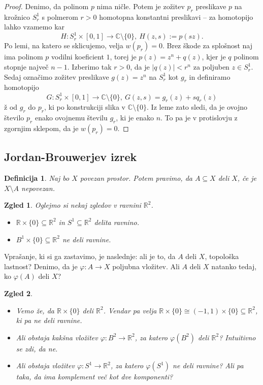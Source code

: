 \documentclass[10pt, a4paper]{article}
\newtheorem{defi}{Definicija}[section]
\newenvironment{noticeB}{%
  \tcolorbox[%
  notitle,
  empty,
  enhanced,  %
  breakable,
  coltext=black,
  colback=white, 
  fontupper=\rmfamily,
  parbox=false,
  noparskip,
  sharp corners,
  boxrule=-1pt,  %
  frame hidden,
  left=7pt,  %
  right=7pt,
  top=5pt,
  bottom=5pt,
  before skip=2.5ex plus 2pt,
  after skip=2.5ex plus 2pt,
  borderline west = {1.5pt}{-0.1pt}{blue!30!black}, %
  overlay unbroken and last={%
    \draw[color=black, line width=1.25pt]
    ($(frame.south west)+(1.pt, -0.1pt)$) -- ++(2em, 0);
  }
  ]}
{\endtcolorbox}
\newenvironment{definicija}{\begin{defi}\begin{noticeB}}{%
    \end{noticeB}\end{defi}}
\newtheorem{zgled}{Zgled}[section]
\newenvironment{noticeC}{%
  \tcolorbox[%
  notitle,
  empty,
  enhanced,  %
  breakable,
  coltext=black, 
  fontupper=\rmfamily,
  parbox=false,
  noparskip,
  sharp corners,
  boxrule=-1pt,  %
  frame hidden,
  left=7pt,  %
  right=7pt,
  top=5pt,
  bottom=5pt,
  before skip=2.5ex plus 2pt,
  after skip=2.5ex plus 2pt,
  overlay unbroken and last={%
  },
  ]}
{\endtcolorbox}
\newenvironment{dokaz}%
  {\begin{noticeC}\begin{proof}}%
  {\end{proof}\end{noticeC}}
\newcommand{\R}{\mathbb {R}}
\newcommand{\C}{\mathbb {C}}
\begin{document}
\begin{dokaz}
  Denimo, da polinom $p$ nima ničle. Potem je zožitev $p_r$ preslikave $p$ 
  na krožnico $S_r^1$ s polmerom $r > 0$ homotopna konstantni preslikavi -- za homotopijo 
  lahko vzamemo kar $$H: S_r ^1 \times [0, 1] \to \C \setminus \{0\},\ H(z, s) := p(sz).$$
  Po lemi, na katero se sklicujemo, velja $w(p_r) = 0.$
  Brez škode za splošnost naj ima polinom $p$ vodilni koeficient $1$, torej je 
  $p(z) = z^n + q(z)$, kjer je $q$ polinom stopnje največ $n - 1$.
  Izberimo tak $r > 0$, da je $|q(z)| < r^n$ za poljuben $z \in S^1 _r$.
  Sedaj označimo zožitev preslikave $g(z) = z^n$ na $S^1 _r$ kot $g_r$ in definiramo homotopijo 
  $$G: S_r ^1 \times [0, 1] \to \C \setminus \{0\},\ G(z, s) = g_r (z) + s q_r(z)$$ ž
  od $g_r$ do $p_r$, ki po konstrukciji slika v $\C \setminus \{0\}$.
  Iz leme zato sledi, da je ovojno število $p_r$ enako ovojnemu številu $g_r$, ki je enako $n$.
  To pa je v protislovju z zgornjim sklepom, da je $w(p_r) = 0.$
\end{dokaz}

\subsection{Jordan-Brouwerjev izrek}

\begin{definicija}
  Naj bo $X$ povezan prostor. Potem pravimo, da $A \subseteq X$ deli $X$,
  če je $X \setminus A$ nepovezan.
\end{definicija}

\begin{zgled}
  Oglejmo si nekaj zgledov v ravnini $\R^2$.
  \begin{itemize}
    \item $\R \times \{0\} \subseteq \R^2$ in $S^1 \subseteq \R^2$ delita ravnino.
    \item $B^1 \times \{0\} \subseteq \R^2$ ne deli ravnine.
  \end{itemize}
\end{zgled}

Vprašanje, ki si ga zastavimo, je naslednje: ali je to, da $A$ deli $X$, topološka lastnost?
Denimo, da je $\varphi: A \to X$ poljubna vložitev. Ali $A$ deli $X$ natanko tedaj, ko 
$\varphi(A)$ deli $X$?

\begin{zgled}
  \begin{itemize}
    \item Vemo že, da $\R \times \{0\}$ deli $\R^2$. 
    Vendar pa velja $\R \times \{0\} \cong (-1, 1) \times \{0\} \subseteq \R^2$,
    ki pa ne deli ravnine.
    \item Ali obstaja kakšna vložitev $\varphi: B^2 \to \R^2$, za katero 
    $\varphi (B^2)$ deli $\R^2$? Intuitivno se zdi, da ne.
    \item Ali obstaja vložitev $\varphi: S^1 \to \R^2$, za katero $\varphi (S^1)$
    ne deli ravnine? Ali pa taka, da ima komplement več kot dve komponenti?
  \end{itemize}
\end{zgled}
\end{document}
